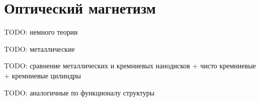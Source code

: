 \section{Оптический магнетизм}

TODO: немного теории \cite{Shalaev2007}

TODO: металлические \cite{Enkrich2005, Evlyukhin2012, Klein2006}

TODO: сравнение металлических и кремниевых нанодисков \cite{Miro2012} + чисто кремниевые \cite{Evlyukhin2012a, Staude2013} + кремниевые цилиндры \cite{Evlyukhin2014}

TODO: аналогичные по функционалу структуры \cite{Vilson2004, Gondarenko2009, Kippenberg2004, Pollinger2009, Soltani2007}